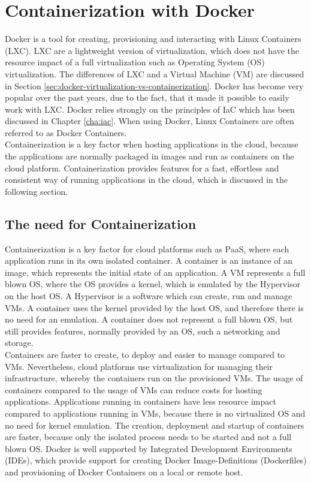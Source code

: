 \chapter{Containerization with Docker}
\label{cha:containerization-docker}
Docker is a tool for creating, provisioning and interacting with Linux Containers (LXC). LXC are a lightweight version of virtualization, which does not have the resource impact of a full virtualization such as Operating System (OS) virtualization. The differences of LXC and a Virtual Machine (VM) are discussed in Section \vref{sec:docker-virtualization-vs-containerization}. Docker has become very popular over the past years, due to the fact, that it made it possible to easily work with LXC. Docker relies strongly on the principles of IaC which has been discussed in Chapter \vref{cha:iac}. When using Docker, Linux Containers are often referred to as Docker Containers\cite{Docker2018,LXC2018}. \\

Containerization is a key factor when hosting applications in the cloud, because the applications are normally packaged in images and run as containers on the cloud platform. Containerization provides features for a fast, effortless and consistent way of running applications in the cloud, which is discussed in the following section.

\section{The need for Containerization}
\label{sec:docker-need-for-containerization}
Containerization is a key factor for cloud platforms such as PaaS, where each application runs in its own isolated container. A container is an instance of an image, which represents the initial state of an application. A VM represents a full blown OS, where the OS provides a kernel, which is emulated by the Hypervisor on the host OS. A Hypervisor is a software which can create, run and manage VMs. A container uses the kernel provided by the host OS, and therefore there is no need for an emulation. A container does not represent a full blown OS, but still provides features, normally provided by an OS, such a networking and storage\cite{DockerVirtScheepers2014}. \\ 

Containers are faster to create, to deploy and easier to manage compared to VMs. Nevertheless, cloud platforms use virtualization for managing their infrastructure, whereby the containers run on the provisioned VMs. The usage of containers compared to the usage of VMs can reduce costs for hosting applications. Applications running in containers have less resource impact compared to applications running in VMs, because there is no virtualized OS and no need for kernel emulation. The creation, deployment and startup of containers are faster, because only the isolated process needs to be started and not a full blown OS. Docker is well supported by Integrated Development Environments (IDEs), which provide support for creating Docker Image-Definitions (Dockerfiles) and provisioning of Docker Containers on a local or remote host\cite{DockerFile2018}. \\

